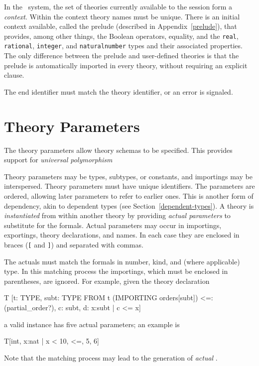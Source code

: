 In the \pvs\ system, the set of theories currently available to the
session form a \emph{context}.  Within the context theory names must be
unique.  There is an initial context available, called the prelude
(described in Appendix~\ref{prelude}), that provides, among other things,
the Boolean operators, equality, and the \texttt{real}, \texttt{rational},
\texttt{integer}, and \texttt{naturalnumber} types and their associated
properties.  The only difference between the prelude and user-defined
theories is that the prelude is automatically imported in every theory,
without requiring an explicit  clause.

The end identifier must match the theory identifier, or an error is
signaled.


\section{Theory Parameters}\label{parameters}

The theory parameters allow theory schemas to be specified.  This
provides support for \emph{universal polymorphism}

Theory parameters may be types, subtypes, or constants, and importings may
be interspersed.  Theory parameters must have unique identifiers.  The
parameters are ordered, allowing later parameters to refer to earlier
ones.  This is another form of dependency, akin to dependent types (see
Section~\ref{dependent-types}).  A theory is \emph{ instantiated} from
within another theory by providing \emph{actual parameters} to substitute for the formals.  Actual parameters may occur in
importings, exportings, theory declarations, and names.  In each case they
are enclosed in braces (\texttt{[} and \texttt{]}) and separated with
commas.

The actuals must match the formals in number, kind, and (where
applicable) type.  In this matching process the importings, which
must be enclosed in parentheses, are ignored.  For example, given the
theory declaration
\begin{pvsex}
  T [t: TYPE,
     subt: TYPE FROM t
     (IMPORTING orders[subt]) <=: (partial_order?),
     c: subt,
     d: \setb{}x:subt | c <= x\sete]
\end{pvsex}
a valid instance has five actual parameters; an example is
\begin{pvsex}
  T[int, \setb{}x:nat | x < 10\sete, <=, 5, 6]
\end{pvsex}
%
Note that the matching process may lead to the generation of \emph{actual}
\tccs.

